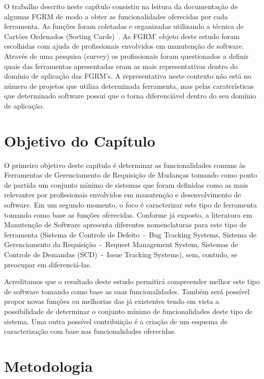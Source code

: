O trabalho descrito neste capítulo consistiu na leitura da documentação de
algumas FGRM de modo a obter as funcionalidades oferecidas por cada ferramenta.
As funções foram coletadas e organizadas utilizando a técnica de Cartões
Ordenados (Sorting Cards)~\cite{5070993}. As FGRM' objeto deste estudo foram
escolhidas com ajuda de profissionais envolvidos em manutenção de software.
Através de uma pesquisa (survey) os profissionais foram questionados a definir
quais das ferramentas apresentadas eram as mais representativas dentro do
domínio de aplicação das FGRM's. A representativa neste contexto não está no
número de projetos que utiliza determinada ferramenta, mas pelas caraterísticas
que determinado software possui que o torna diferenciável dentro do seu domínio
de aplicação.

\section{Objetivo do Capítulo}
\label{sec:objetivo_do_capítulo}

O primeiro objetivo deste capítulo é determinar as funcionalidades comuns às
Ferramentas de Gerenciamento de Requisição de Mudanças tomando como ponto de
partida um conjunto mínimo de sistemas que foram definidas como as mais
relevantes por profissionais envolvidos em manutenção e desenvolvimento de
software. Em um segundo momento, o foco é caracterizar este tipo de ferramenta
tomando como base as funções oferecidas. Conforme já exposto, a literatura em
Manutenção de Software apresenta diferentes nomenclaturas para este tipo de
ferramenta (Sistema de Controle de Defeito~-~Bug Tracking Systems, Sistema de
Gerenciamento da Requisição~-~Request Management System, Sistemas de Controle de
Demandas (SCD)~-~Issue Tracking Systems), sem, contudo, se preocupar em
diferenciá-las.

Acreditamos que o resultado deste estudo permitirá compreender melhor este tipo
de software tomando como base as suas funcionalidades. Também será possível
propor novas funções ou melhorias das já existentes tendo em vista a
possibilidade de determinar o conjunto mínimo de funcionalidades deste tipo de
sistema. Uma outra possível contribuição é a criação de um
esquema de caracterização com base nas funcionalidades oferecidas.

\section{Metodologia}
\label{sec:metodologia}

